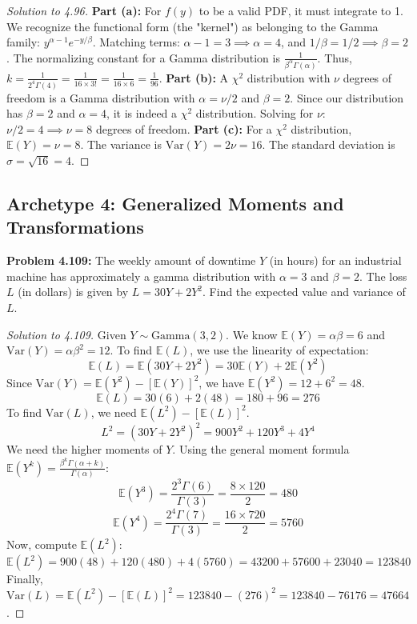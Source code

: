 \documentclass[11pt, a4paper]{article}
\theoremstyle{definition}
\theoremstyle{remark}
\newcommand{\E}{\mathbb{E}}
\begin{document}
\begin{proof}[Solution to 4.96]
\textbf{Part (a):} For $f(y)$ to be a valid PDF, it must integrate to 1. We recognize the functional form (the "kernel") as belonging to the Gamma family: $y^{\alpha-1} e^{-y/\beta}$.
Matching terms: $\alpha - 1 = 3 \implies \alpha = 4$, and $1/\beta = 1/2 \implies \beta = 2$.
The normalizing constant for a Gamma distribution is $\frac{1}{\beta^\alpha \Gamma(\alpha)}$.
Thus, $k = \frac{1}{2^4 \Gamma(4)} = \frac{1}{16 \times 3!} = \frac{1}{16 \times 6} = \frac{1}{96}$.
\textbf{Part (b):} A $\chi^2$ distribution with $\nu$ degrees of freedom is a Gamma distribution with $\alpha = \nu/2$ and $\beta = 2$. Since our distribution has $\beta = 2$ and $\alpha = 4$, it is indeed a $\chi^2$ distribution.
Solving for $\nu$: $\nu/2 = 4 \implies \nu = 8$ degrees of freedom.
\textbf{Part (c):} For a $\chi^2$ distribution, $\E(Y) = \nu = 8$. The variance is $\text{Var}(Y) = 2\nu = 16$. The standard deviation is $\sigma = \sqrt{16} = 4$.
\end{proof}

\subsection{Archetype 4: Generalized Moments and Transformations}

\textbf{Problem 4.109:} The weekly amount of downtime $Y$ (in hours) for an industrial machine has approximately a gamma distribution with $\alpha = 3$ and $\beta = 2$. The loss $L$ (in dollars) is given by $L = 30Y + 2Y^2$. Find the expected value and variance of $L$.

\begin{proof}[Solution to 4.109]
Given $Y \sim \text{Gamma}(3, 2)$. We know $\E(Y) = \alpha\beta = 6$ and $\text{Var}(Y) = \alpha\beta^2 = 12$.
To find $\E(L)$, we use the linearity of expectation:
\[ \E(L) = \E(30Y + 2Y^2) = 30\E(Y) + 2\E(Y^2) \]
Since $\text{Var}(Y) = \E(Y^2) - [\E(Y)]^2$, we have $\E(Y^2) = 12 + 6^2 = 48$.
\[ \E(L) = 30(6) + 2(48) = 180 + 96 = 276 \]
To find $\text{Var}(L)$, we need $\E(L^2) - [\E(L)]^2$.
\[ L^2 = (30Y + 2Y^2)^2 = 900Y^2 + 120Y^3 + 4Y^4 \]
We need the higher moments of $Y$. Using the general moment formula $\E(Y^k) = \frac{\beta^k \Gamma(\alpha+k)}{\Gamma(\alpha)}$:
\[ \E(Y^3) = \frac{2^3 \Gamma(6)}{\Gamma(3)} = \frac{8 \times 120}{2} = 480 \]
\[ \E(Y^4) = \frac{2^4 \Gamma(7)}{\Gamma(3)} = \frac{16 \times 720}{2} = 5760 \]
Now, compute $\E(L^2)$:
\[ \E(L^2) = 900(48) + 120(480) + 4(5760) = 43200 + 57600 + 23040 = 123840 \]
Finally, $\text{Var}(L) = \E(L^2) - [\E(L)]^2 = 123840 - (276)^2 = 123840 - 76176 = 47664$.
\end{proof}
\end{document}

